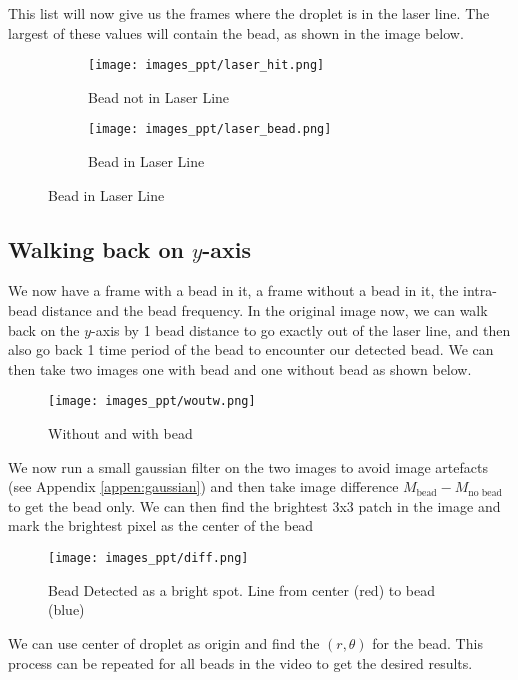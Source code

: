 \documentclass[hidelinks]{book}
\numberwithin{equation}{section}
\begin{document}
This list will now give us the frames where the droplet is in the laser line. The largest of these values will contain the bead, as shown in the image below.

\begin{figure}[H]
  \centering
  \begin{subfigure}{.5\textwidth}
    \centering
    \texttt{[image: images\_ppt/laser\_hit.png]}
    \caption{Bead not in Laser Line}
  \end{subfigure}%
  \begin{subfigure}{.5\textwidth}
    \centering
    \texttt{[image: images\_ppt/laser\_bead.png]}
    \caption{Bead in Laser Line}
  \end{subfigure}
\end{figure}

\subsection{Walking back on $y$-axis}\label{ssec:bead}
We now have a frame with a bead in it, a frame without a bead in it, the intra-bead distance and the bead frequency. In the original image now, we can walk back on the $y$-axis by 1 bead distance to go exactly out of the laser line, and then also go back 1 time period of the bead to encounter our detected bead. We can then take two images one with bead and one without bead as shown below.

\begin{figure}[H]
  \centering
  \texttt{[image: images\_ppt/woutw.png]}
  \caption{Without and with bead}
\end{figure}

We now run a small gaussian filter on the two images to avoid image artefacts (see Appendix \ref{appen:gaussian}) and then take image difference $M_{\text{bead}} - M_{\text{no bead}}$ to get the bead only. We can then find the brightest 3x3 patch in the image and mark the brightest pixel as the center of the bead

\begin{figure}[H]
  \centering
  \texttt{[image: images\_ppt/diff.png]}
  \caption{Bead Detected as a bright spot. Line from center (red) to bead (blue)}
\end{figure}

We can use center of droplet as origin and find the $(r, \theta)$ for the bead. This process can be repeated for all beads in the video to get the desired results.
\end{document}
